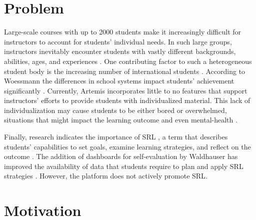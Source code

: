 \documentclass[a4paper,12pt,twoside]{article}
\begin{document}
\section{Problem}

Large-scale courses with up to 2000 students make it increasingly difficult for instructors to account for students' individual needs. In such large groups,
instructors inevitably encounter students with vastly different backgrounds, abilities, ages, and experiences \cite{mulryan2010teaching}.
One contributing factor to such a heterogeneous student body is the increasing number of international students \cite{oecd2011}. According to
Woessmann the differences in school systems impact students' achievement significantly \cite{woessmann2016importance}.
Currently, Artemis incorporates little to no features that support instructors' efforts to provide students with individualized material. This lack
of individualization may cause students to be either bored or overwhelmed, situations that might impact the learning outcome and even mental-health
\cite{graciani2020m, kadison2004college}.

Finally, research indicates the importance of \ac{SRL} \cite{bjork2013self}, a term that describes students' capabilities to set goals, examine learning
strategies, and reflect on the outcome \cite{butler1995feedback}. The addition of dashboards for self-evaluation by Waldhauser has improved the availability
of data that students require to plan and apply \ac{SRL} strategies \cite{waldhauser2021}. However, the platform does not actively promote \ac{SRL}.


\section{Motivation}
\end{document}
